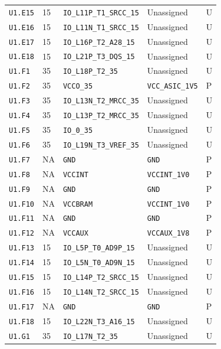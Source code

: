 \documentclass[11pt,a4paper]{article}
\begin{document}
\begin{longtable}{@{}P{20mm}P{10mm}P{70mm}P{51mm}P{11mm}@{}}
\nolinkurl{U1.E15} & 15 & \nolinkurl{IO_L11P_T1_SRCC_15} & Unassigned & U \\
\nolinkurl{U1.E16} & 15 & \nolinkurl{IO_L11N_T1_SRCC_15} & Unassigned & U \\
\nolinkurl{U1.E17} & 15 & \nolinkurl{IO_L16P_T2_A28_15} & Unassigned & U \\
\nolinkurl{U1.E18} & 15 & \nolinkurl{IO_L21P_T3_DQS_15} & Unassigned & U \\
\nolinkurl{U1.F1} & 35 & \nolinkurl{IO_L18P_T2_35} & Unassigned & U \\
\nolinkurl{U1.F2} & 35 & \nolinkurl{VCCO_35} & \nolinkurl{VCC_ASIC_1V5} & P \\
\nolinkurl{U1.F3} & 35 & \nolinkurl{IO_L13N_T2_MRCC_35} & Unassigned & U \\
\nolinkurl{U1.F4} & 35 & \nolinkurl{IO_L13P_T2_MRCC_35} & Unassigned & U \\
\nolinkurl{U1.F5} & 35 & \nolinkurl{IO_0_35} & Unassigned & U \\
\nolinkurl{U1.F6} & 35 & \nolinkurl{IO_L19N_T3_VREF_35} & Unassigned & U \\
\nolinkurl{U1.F7} & NA & \nolinkurl{GND} & \nolinkurl{GND} & P \\
\nolinkurl{U1.F8} & NA & \nolinkurl{VCCINT} & \nolinkurl{VCCINT_1V0} & P \\
\nolinkurl{U1.F9} & NA & \nolinkurl{GND} & \nolinkurl{GND} & P \\
\nolinkurl{U1.F10} & NA & \nolinkurl{VCCBRAM} & \nolinkurl{VCCINT_1V0} & P \\
\nolinkurl{U1.F11} & NA & \nolinkurl{GND} & \nolinkurl{GND} & P \\
\nolinkurl{U1.F12} & NA & \nolinkurl{VCCAUX} & \nolinkurl{VCCAUX_1V8} & P \\
\nolinkurl{U1.F13} & 15 & \nolinkurl{IO_L5P_T0_AD9P_15} & Unassigned & U \\
\nolinkurl{U1.F14} & 15 & \nolinkurl{IO_L5N_T0_AD9N_15} & Unassigned & U \\
\nolinkurl{U1.F15} & 15 & \nolinkurl{IO_L14P_T2_SRCC_15} & Unassigned & U \\
\nolinkurl{U1.F16} & 15 & \nolinkurl{IO_L14N_T2_SRCC_15} & Unassigned & U \\
\nolinkurl{U1.F17} & NA & \nolinkurl{GND} & \nolinkurl{GND} & P \\
\nolinkurl{U1.F18} & 15 & \nolinkurl{IO_L22N_T3_A16_15} & Unassigned & U \\
\nolinkurl{U1.G1} & 35 & \nolinkurl{IO_L17N_T2_35} & Unassigned & U \\

\end{longtable}
\end{document}
